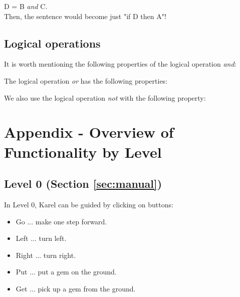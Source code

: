 \documentclass[article,A4,12pt]{llncs}
\begin{document}
\noindent
D = B {\em and} C.\\

\noindent
Then, the sentence would become just "if D then A"! 

\subsection{Logical operations}

It is worth mentioning the following properties of the logical operation {\em and}:\\

\begin{center}
\end{center}
\vspace{4mm}
\noindent
The logical operation {\em or} has the following properties:\\

\begin{center}
\end{center}
\vspace{4mm}
\noindent
We also use the logical operation {\em not} with the following property:\\

\begin{center}
\end{center}


\section{Appendix - Overview of Functionality by Level}\label{sec:newfunc3}

\subsection{Level 0 (Section \ref{sec:manual})}

In Level 0, Karel can be guided by clicking on buttons:
\begin{itemize}
\item Go ... make one step forward.
\item Left ... turn left.
\item Right ... turn right.
\item Put ... put a gem on the ground.
\item Get ... pick up a gem from the ground.
\end{itemize}
\end{document}

